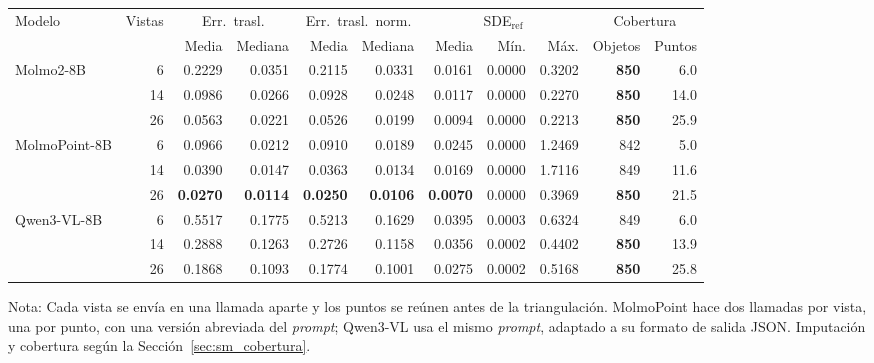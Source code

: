 \begin{table}[H]
\begin{tabular*}{\textwidth}{@{\extracolsep{\fill}}lrrrrrrrrrr@{}}
\toprule
\multirow{2}{*}{Modelo} & \multirow{2}{*}{Vistas} & \multicolumn{2}{c}{Err.\ trasl.} & \multicolumn{2}{c}{Err.\ trasl.\ norm.} & \multicolumn{3}{c}{SDE$_{\mathrm{ref}}$} & \multicolumn{2}{c}{Cobertura} \\
\cmidrule(lr){3-4} \cmidrule(lr){5-6} \cmidrule(lr){7-9} \cmidrule(lr){10-11}
 &  & Media & Mediana & Media & Mediana & Media & Mín. & Máx. & Objetos & Puntos \\
\midrule
\multirow{3}{*}{Molmo2-8B} & 6 & 0.2229 & 0.0351 & 0.2115 & 0.0331 & 0.0161 & 0.0000 & 0.3202 & \textbf{850} & 6.0 \\
 & 14 & 0.0986 & 0.0266 & 0.0928 & 0.0248 & 0.0117 & 0.0000 & 0.2270 & \textbf{850} & 14.0 \\
 & 26 & 0.0563 & 0.0221 & 0.0526 & 0.0199 & 0.0094 & 0.0000 & 0.2213 & \textbf{850} & 25.9 \\
\midrule
\multirow{3}{*}{MolmoPoint-8B} & 6 & 0.0966 & 0.0212 & 0.0910 & 0.0189 & 0.0245 & 0.0000 & 1.2469 & 842 & 5.0 \\
 & 14 & 0.0390 & 0.0147 & 0.0363 & 0.0134 & 0.0169 & 0.0000 & 1.7116 & 849 & 11.6 \\
 & 26 & \textbf{0.0270} & \textbf{0.0114} & \textbf{0.0250} & \textbf{0.0106} & \textbf{0.0070} & 0.0000 & 0.3969 & \textbf{850} & 21.5 \\
\midrule
\multirow{3}{*}{Qwen3-VL-8B} & 6 & 0.5517 & 0.1775 & 0.5213 & 0.1629 & 0.0395 & 0.0003 & 0.6324 & 849 & 6.0 \\
 & 14 & 0.2888 & 0.1263 & 0.2726 & 0.1158 & 0.0356 & 0.0002 & 0.4402 & \textbf{850} & 13.9 \\
 & 26 & 0.1868 & 0.1093 & 0.1774 & 0.1001 & 0.0275 & 0.0002 & 0.5168 & \textbf{850} & 25.8 \\
\bottomrule
\end{tabular*}

\vspace{1.5ex}
\begin{minipage}{\textwidth}
Nota: Cada vista se envía en una llamada aparte y los puntos se reúnen antes de la triangulación. MolmoPoint hace dos llamadas por vista, una por punto, con una versión abreviada del \textit{prompt}; Qwen3-VL usa el mismo \textit{prompt}, adaptado a su formato de salida JSON. Imputación y cobertura según la Sección~\ref{sec:sm_cobertura}.
\end{minipage}
\end{table}


